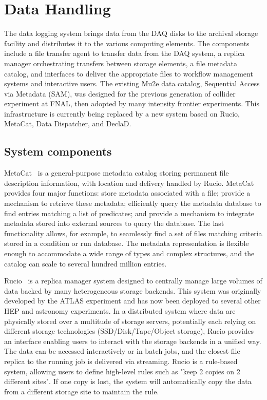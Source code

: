 \section{Data Handling}
\label{sec:datahandling}

The data logging system brings data from the DAQ disks to the archival storage facility and distributes it to the various computing elements. The components include a file transfer agent to transfer data from the DAQ system, a replica manager orchestrating transfers between storage elements, a file metadata catalog, and interfaces to deliver the appropriate files to workflow management systems and interactive users. The existing Mu2e data catalog, Sequential Access via Metadata (SAM), was designed for the previous generation of collider experiment at FNAL, then adopted by many intensity frontier experiments. This infrastructure is currently being replaced by a new system based on Rucio, MetaCat, Data Dispatcher, and DeclaD.

\subsection{System components}
MetaCat~\cite{Mandrichenko:2021spd} is a general-purpose metadata catalog storing permanent file description information, with location and delivery handled by Rucio. MetaCat provides four major functions: store metadata associated with a file; provide a mechanism to retrieve these metadata; efficiently query the metadata database to find entries matching a list of predicates; and provide a mechanism to integrate metadata stored into external sources to query the database. The last functionality allows, for example, to seamlessly find a set of files matching criteria stored in a condition or run database. The metadata representation is flexible enough to accommodate a wide range of types and complex structures, and the catalog can scale to several hundred million entries.

Rucio~\cite{Barisits:2019fyl} is a replica manager system designed to centrally manage large volumes of data backed by many heterogeneous storage backends. This system was originally developed by the ATLAS experiment and has now been deployed to several other HEP and astronomy experiments. In a distributed system where data are physically stored over a multitude of storage servers, potentially each relying on different storage technologies (SSD/Disk/Tape/Object storage), Rucio provides an interface enabling users to interact with the storage backends in a unified way. The data can be accessed interactively or in batch jobs, and the closest file replica to the running job is delivered via streaming. Rucio is a rule-based system, allowing users to define high-level rules such as "keep 2 copies on 2 different sites". If one copy is lost, the system will automatically copy the data from a different storage site to maintain the rule. 

